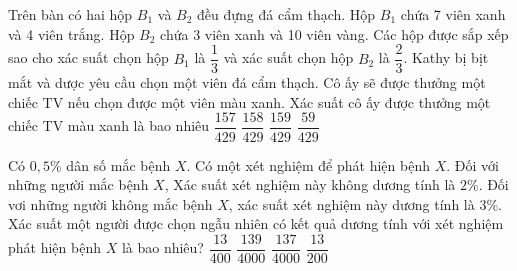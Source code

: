 \begin{ex}%
	Trên bàn có hai hộp $B_1$ và $B_2$ đều đựng đá cẩm thạch. Hộp $B_1$ chứa 7 viên xanh và 4 viên trắng. Hộp $B_2$ chứa 3 viên xanh và 10 viên vàng. Các hộp được sắp xếp sao cho xác suất chọn hộp $B_1$ là $\dfrac{1}{3}$ và xác suất chọn hộp $B_2$ là $\dfrac{2}{3}$. Kathy bị bịt mắt và dược yêu cầu chọn một viên đá cẩm thạch. Cô ấy sẽ được thưởng một chiếc TV nếu chọn được một viên màu xanh. Xác suất cô ấy được thưởng một chiếc TV màu xanh là bao nhiêu
	\choice
	{\True $\dfrac{157}{429}$}
	{$\dfrac{158}{429}$}
	{$\dfrac{159}{429}$}
	{$\dfrac{59}{429}$}
\end{ex}

\begin{ex}%
Có $0{,}5\%$ dân số mắc bệnh $X$. Có một xét nghiệm để phát hiện bệnh $X$. Đối với những người mắc bệnh $X$, Xác suất xét nghiệm này không dương tính là $2\%$. Đối vơi những người không mắc bệnh $X$, xác suất xét nghiệm này dương tính là $3\%$. Xác suất một người được chọn ngẫu nhiên có kết quả dương tính với xét nghiệm phát hiện bệnh $X$ là bao nhiêu?
	\choice
	{$\dfrac{13}{400}$}
	{\True $\dfrac{139}{4000}$}
	{$\dfrac{137}{4000}$}
	{$\dfrac{13}{200}$}
\end{ex}


